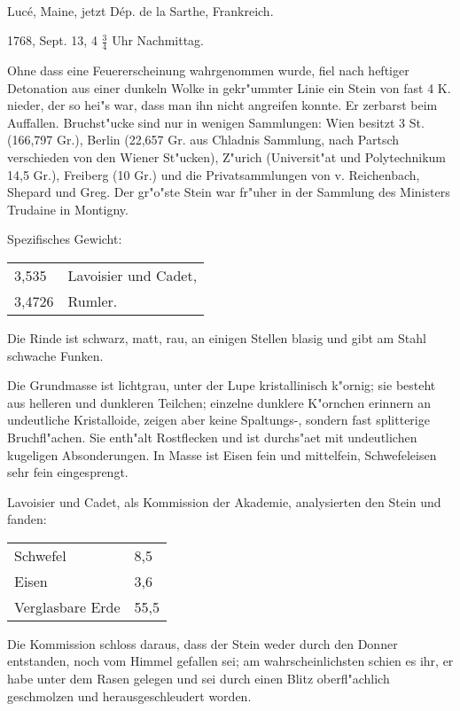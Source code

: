 \documentclass[a4paper, 11pt, oneside]{article}
\begin{document}
\paragraph{}
Lucé, Maine, jetzt Dép. de la Sarthe, Frankreich.

1768, Sept. 13, 4 $\frac{3}{4}$ Uhr Nachmittag.

Ohne dass eine Feuererscheinung wahrgenommen wurde, fiel nach heftiger Detonation aus einer dunkeln Wolke in gekr"ummter Linie ein Stein von fast 4 K. nieder, der so hei"s war, dass man ihn nicht angreifen konnte. Er zerbarst beim Auffallen. Bruchst"ucke sind nur in wenigen Sammlungen: Wien besitzt 3 St. (166,797 Gr.), Berlin (22,657 Gr. aus Chladnis Sammlung, nach Partsch verschieden von den Wiener St"ucken), Z"urich (Universit"at und Polytechnikum 14,5 Gr.), Freiberg (10 Gr.) und die Privatsammlungen von v. Reichenbach, Shepard und Greg. Der gr"o"ste Stein war fr"uher in der Sammlung des Ministers Trudaine in Montigny.

Spezifisches Gewicht:
\begin{table}[!ht]
    \centering
    \begin{tabular}{l l}
        3,535 & Lavoisier und Cadet,\\
        3,4726 & Rumler.
    \end{tabular}
\end{table}

Die Rinde ist schwarz, matt, rau, an einigen Stellen blasig und gibt am Stahl schwache Funken.

Die Grundmasse ist lichtgrau, unter der Lupe kristallinisch k"ornig; sie besteht aus helleren und dunkleren Teilchen; einzelne dunklere K"ornchen erinnern an undeutliche Kristalloide, zeigen aber keine Spaltungs-, sondern fast splitterige Bruchfl"achen. Sie enth"alt Rostflecken und ist durchs"aet mit undeutlichen kugeligen Absonderungen. In Masse ist Eisen fein und mittelfein, Schwefeleisen sehr fein eingesprengt.

Lavoisier und Cadet, als Kommission der Akademie, analysierten den Stein und fanden:
\begin{table}[!ht]
    \centering
    \begin{tabular}{l l}
        Schwefel & 8,5\\
        Eisen & 3,6\\
        Verglasbare Erde & 55,5
    \end{tabular}
\end{table}

Die Kommission schloss daraus, dass der Stein weder durch den Donner entstanden, noch vom Himmel gefallen sei; am wahrscheinlichsten schien es ihr, er habe unter dem Rasen gelegen und sei durch einen Blitz oberfl"achlich geschmolzen und herausgeschleudert worden.
\footnotesize
\end{document}
